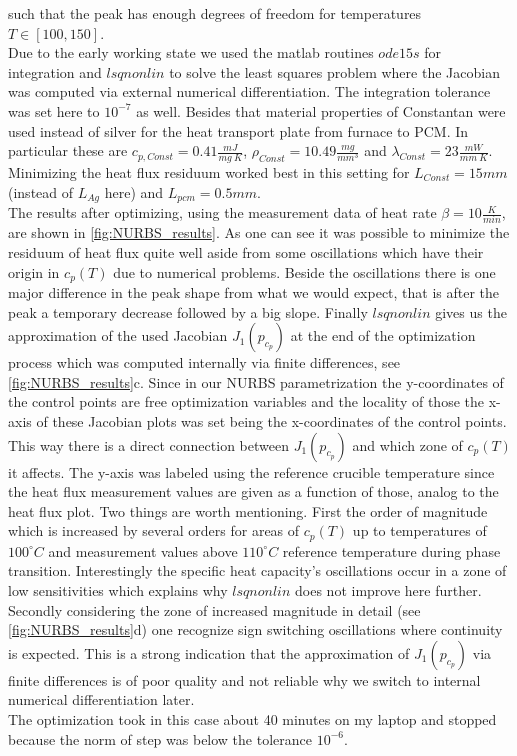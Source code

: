 \documentclass{scrartcl}[12pt, halfparskip]
\numberwithin{equation}{section}
\numberwithin{figure}{section}
\numberwithin{table}{section}
\begin{document}
such that the peak has enough degrees of freedom for temperatures $T \in [100, 150]$. \\
Due to the early working state we used the matlab routines $ode15s$ for integration and $lsqnonlin$ to solve the least squares problem where the Jacobian was computed via external numerical differentiation. The integration tolerance was set here to $10^{-7}$ as well. Besides that material properties of Constantan were used instead of silver for the heat transport plate from furnace to PCM. In particular these are $c_{p,Const}=0.41\frac{mJ}{mg \ K}$, $\rho_{Const}=10.49\frac{mg}{mm^3}$ and $\lambda_{Const}=23\frac{mW}{mm \ K}$. \\
Minimizing the heat flux residuum worked best in this setting for $L_{Const}=15mm$ (instead of $L_{Ag}$ here) and $L_{pcm}=0.5mm$. \\
The results after optimizing, using the measurement data of heat rate $\beta = 10 \frac{K}{min}$, are shown in \cref{fig:NURBS_results}. As one can see it was possible to minimize the residuum of heat flux quite well aside from some oscillations which have their origin in $c_p(T)$ due to numerical problems. Beside the oscillations there is one major difference in the peak shape from what we would expect, that is after the peak a temporary decrease followed by a big slope.
Finally $lsqnonlin$ gives us the approximation of the used Jacobian $J_1(p_{c_p})$ at the end of the optimization process which was computed internally via finite differences, see \cref{fig:NURBS_results}c. Since in our NURBS parametrization the y-coordinates of the control points are free optimization variables and the locality of those the x-axis of these Jacobian plots was set being the x-coordinates of the control points. This way there is a direct connection between $J_1(p_{c_p})$ and which zone of $c_p(T)$ it affects. The y-axis was labeled using the reference crucible temperature since the heat flux measurement values are given as a function of those, analog to the heat flux plot.
Two things are worth mentioning. First the order of magnitude which is increased by several orders for areas of $c_p(T)$ up to temperatures of $100^\circ C$ and measurement values above $110^\circ C$ reference temperature during phase transition. Interestingly the specific heat capacity's oscillations occur in a zone of low sensitivities which explains why $lsqnonlin$ does not improve here further. 
Secondly considering the zone of increased magnitude in detail (see \cref{fig:NURBS_results}d) one recognize sign switching oscillations where continuity is expected. This is a strong indication that the approximation of $J_1(p_{c_p})$ via finite differences is of poor quality and not reliable why we switch to internal numerical differentiation later. \\
The optimization took in this case about 40 minutes on my laptop and stopped because the norm of step was below the tolerance $10^{-6}$.
\end{document}

